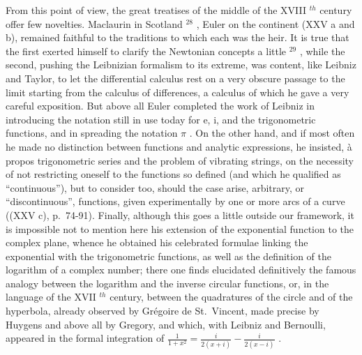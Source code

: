 From this point of view, the great treatises of the middle of the XVIII \(^{th}\) century offer few novelties. Maclaurin in Scotland \(^{28}\) , Euler on the continent (XXV a and b), remained faithful to the traditions to which each was the heir. It is true that the first exerted himself to clarify the Newtonian concepts a little \(^{29}\) , while the second, pushing the Leibnizian formalism to its extreme, was content, like Leibniz and Taylor, to let the differential calculus rest on a very obscure passage to the limit starting from the calculus of differences, a calculus of which he gave a very careful exposition. But above all Euler completed the work of Leibniz in introducing the notation still in use today for e, i, and the trigonometric functions, and in spreading the notation \(\pi\) . On the other hand, and if most often he made no distinction between functions and analytic expressions, he insisted, à propos trigonometric series and the problem of vibrating strings, on the necessity of not restricting oneself to the functions so defined (and which he qualified as ``continuous''), but to consider too, should the case arise, arbitrary, or ``discontinuous'', functions, given experimentally by one or more arcs of a curve ((XXV c), p.~74-91). Finally, although this goes a little outside our framework, it is impossible not to mention here his extension of the exponential function to the complex plane, whence he obtained his celebrated formulae linking the exponential with the trigonometric functions, as well as the definition of the logarithm of a complex number; there one finds elucidated definitively the famous analogy between the logarithm and the inverse circular functions, or, in the language of the XVII \(^{th}\) century, between the quadratures of the circle and of the hyperbola, already observed by Grégoire de St.~Vincent, made precise by Huygens and above all by Gregory, and which, with Leibniz and Bernoulli, appeared in the formal integration of \(\frac{1}{1 + x^{2}} = \frac{i}{2(x + i)} - \frac{i}{2(x - i)}\) .
